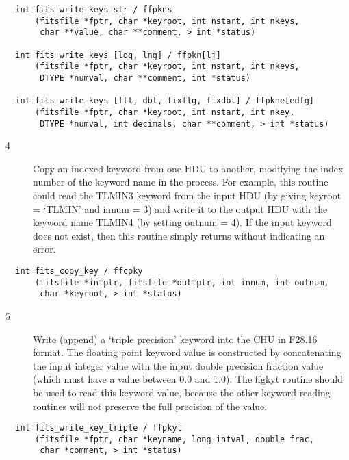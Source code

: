 \documentclass[11pt]{book}
\begin{document}
\begin{verbatim}
  int fits_write_keys_str / ffpkns
      (fitsfile *fptr, char *keyroot, int nstart, int nkeys,
       char **value, char **comment, > int *status)

  int fits_write_keys_[log, lng] / ffpkn[lj]
      (fitsfile *fptr, char *keyroot, int nstart, int nkeys,
       DTYPE *numval, char **comment, int *status)

  int fits_write_keys_[flt, dbl, fixflg, fixdbl] / ffpkne[edfg]
      (fitsfile *fptr, char *keyroot, int nstart, int nkey,
       DTYPE *numval, int decimals, char **comment, > int *status)
\end{verbatim}

\begin{description}
\item[4 ]Copy an indexed keyword from one HDU to another, modifying
    the index number of the keyword name in the process.  For example,
    this routine could read the TLMIN3 keyword from the input HDU
    (by giving keyroot = `TLMIN' and innum = 3) and write it to the
    output HDU with the keyword name TLMIN4 (by setting outnum = 4).
    If the input keyword does not exist, then this routine simply
   returns without indicating an error. \label{ffcpky}
\end{description}

\begin{verbatim}
  int fits_copy_key / ffcpky
      (fitsfile *infptr, fitsfile *outfptr, int innum, int outnum,
       char *keyroot, > int *status)
\end{verbatim}

\begin{description}
\item[5 ]Write (append) a `triple precision' keyword into the CHU in F28.16 format.
    The floating point keyword value is constructed by concatenating the
    input integer value with the input double precision fraction value
    (which must have a value between 0.0 and 1.0). The ffgkyt routine should
    be used to read this keyword value, because the other keyword reading
   routines will not preserve the full precision of the value. \label{ffpkyt}
\end{description}

\begin{verbatim}
  int fits_write_key_triple / ffpkyt
      (fitsfile *fptr, char *keyname, long intval, double frac,
       char *comment, > int *status)
\end{verbatim}
\end{document}
